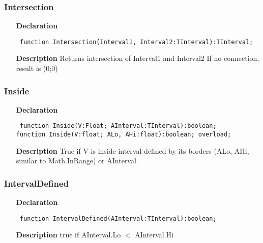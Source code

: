 \documentclass[12pt,a4paper,oneside]{report}
\newcommand{\declarationitem}[1]{\textbf{#1}}
\newcommand{\descriptiontitle}[1]{\textbf{#1}}
\newcommand{\code}[1]{\texttt{#1}}
\begin{document}
\subsubsection{Intersection}
\label{uIntervals-Intersection}
\begin{itemize}\item[\declarationitem{Declaration}\hfill]
\begin{flushleft}
\code{
function Intersection(Interval1, Interval2:TInterval):TInterval;}

\end{flushleft}

\par
\item[\descriptiontitle{Description}]
Returns intersection of Interval1 and Interval2 If no connection, result is (0;0)

\end{itemize}
\subsubsection{Inside}
\label{uIntervals-Inside}
\begin{itemize}\item[\declarationitem{Declaration}\hfill]
\begin{flushleft}
\code{
function Inside(V:Float; AInterval:TInterval):boolean;\\
function Inside(V:float; ALo, AHi:float):boolean; overload;}
\end{flushleft}
\item[\descriptiontitle{Description}]
True if V is inside interval defined by its borders (ALo, AHi, similar to Math.InRange) or AInterval.
\end{itemize}
\subsubsection{IntervalDefined}
\label{uIntervals-IntervalDefined}
\begin{itemize}\item[\declarationitem{Declaration}\hfill]
\begin{flushleft}
\code{
function IntervalDefined(AInterval:TInterval):boolean;}

\end{flushleft}

\par
\item[\descriptiontitle{Description}]
true if AInterval.Lo {$<$} AInterval.Hi

\end{itemize}
\end{document}
